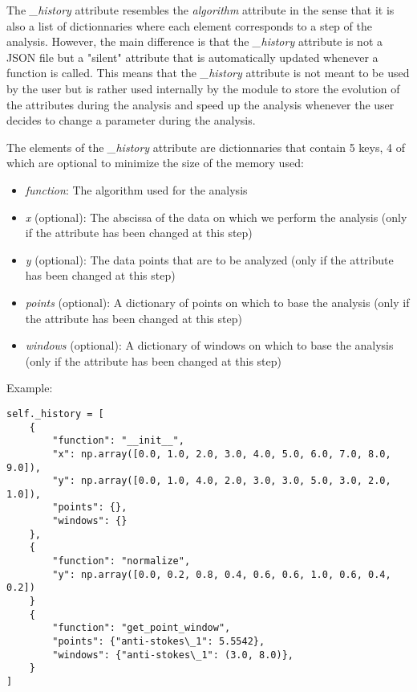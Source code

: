 The \textit{\_history} attribute resembles the \textit{algorithm} attribute in the sense that it is also a list of dictionnaries where each element corresponds to a step of the analysis. However, the main difference is that the \textit{\_history} attribute is not a JSON file but a "silent" attribute that is automatically updated whenever a function is called. This means that the \textit{\_history} attribute is not meant to be used by the user but is rather used internally by the module to store the evolution of the attributes during the analysis and speed up the analysis whenever the user decides to change a parameter during the analysis.

The elements of the \textit{\_history} attribute are dictionnaries that contain 5 keys, 4 of which are optional to minimize the size of the memory used:
\begin{itemize}
    \item \textit{function}: The algorithm used for the analysis
    \item \textit{x} (optional): The abscissa of the data on which we perform the analysis (only if the attribute has been changed at this step)
    \item \textit{y} (optional): The data points that are to be analyzed (only if the attribute has been changed at this step)
    \item \textit{points} (optional): A dictionary of points on which to base the analysis (only if the attribute has been changed at this step)
    \item \textit{windows} (optional): A dictionary of windows on which to base the analysis (only if the attribute has been changed at this step)
\end{itemize}

Example:
\begin{lstlisting}
self._history = [
    {
        "function": "__init__",
        "x": np.array([0.0, 1.0, 2.0, 3.0, 4.0, 5.0, 6.0, 7.0, 8.0, 9.0]),
        "y": np.array([0.0, 1.0, 4.0, 2.0, 3.0, 3.0, 5.0, 3.0, 2.0, 1.0]),
        "points": {},
        "windows": {}
    },
    {
        "function": "normalize",
        "y": np.array([0.0, 0.2, 0.8, 0.4, 0.6, 0.6, 1.0, 0.6, 0.4, 0.2])
    }
    {
        "function": "get_point_window",
        "points": {"anti-stokes\_1": 5.5542},
        "windows": {"anti-stokes\_1": (3.0, 8.0)},
    }
]
\end{lstlisting}